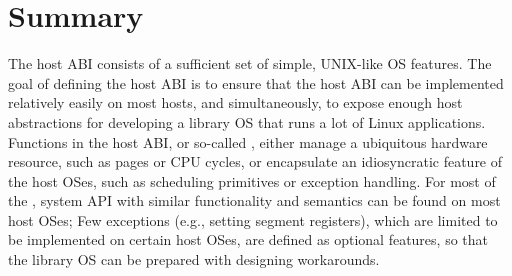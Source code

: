 \section{Summary}
\label{sec:abi:summary}



The host ABI consists of a sufficient set of simple, UNIX-like OS features.
The goal of defining the host ABI
is to ensure that the host ABI can be implemented relatively easily on most hosts,
and simultaneously, to expose enough host abstractions for developing a library OS that runs a lot of Linux applications.
Functions in the host ABI,
or so-called \hostapis{},
either manage a ubiquitous hardware resource, such as pages or CPU cycles,
or encapsulate an idiosyncratic feature of the host OSes, such as scheduling primitives or exception handling.
For most of the \hostapis{}, system API with similar functionality and semantics
can be found on most host OSes;
Few exceptions
(e.g., setting segment registers),
which are limited to be implemented on certain host OSes,
are defined as optional features,
so that the library OS can be prepared with designing workarounds.


